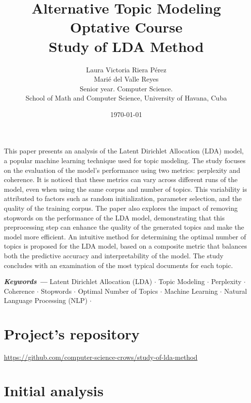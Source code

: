 \documentclass[10pt]{article} %
\title{\normalsize{Alternative Topic Modeling Optative Course}\\
	\Huge\bfseries Study of LDA Method \\
} %
\author{%
	Laura Victoria Riera P\'erez\\
	Mari\'e del Valle Reyes \vspace{1em} \\
	\small Senior year. Computer Science. \\ %
	\small School of Math and Computer Science, University of Havana, Cuba \\ %
}
\date{\footnotesize \today } %
\providecommand{\keywords}[1]
{
	\small	
	\vspace{0.5em}
	\noindent \textbf{\textit{Keywords --- }} #1
}
\renewenvironment{abstract}
{\small
	\begin{center}
		\bfseries \abstractname\vspace{-.5em}\vspace{0pt}
	\end{center}
	\list{}{
		\setlength{\leftmargin}{1.5cm}%
		\setlength{\rightmargin}{\leftmargin}%
	}%
	\item\relax}
{\endlist}
\begin{document}
	
	\maketitle
	
	\begin{abstract}
		This paper presents an analysis of the Latent Dirichlet Allocation (LDA) model, a popular machine learning technique used for topic modeling. The study focuses on the evaluation of the model's performance using two metrics: perplexity and coherence. It is noticed that these metrics can vary across different runs of the model, even when using the same corpus and number of topics. This variability is attributed to factors such as random initialization, parameter selection, and the quality of the training corpus. The paper also explores the impact of removing stopwords on the performance of the LDA model, demonstrating that this preprocessing step can enhance the quality of the generated topics and make the model more efficient. An intuitive method for determining the optimal number of topics is proposed for the LDA model, based on a composite metric that balances both the predictive accuracy and interpretability of the model. The study concludes with an examination of the most typical documents for each topic.
		
		\keywords{Latent Dirichlet Allocation (LDA) $\cdot$
			Topic Modeling $\cdot$
			Perplexity $\cdot$
			Coherence $\cdot$
			Stopwords $\cdot$
			Optimal Number of Topics $\cdot$
			Machine Learning $\cdot$
			Natural Language Processing (NLP) $\cdot$ }
	\end{abstract}

	\section*{Project's repository}
	
	\begin{center}
		\href{https://github.com/computer-science-crows/study-of-lda-method}{https://github.com/computer-science-crows/study-of-lda-method}
	\end{center}
	
	\section{Initial analysis}
	
\end{document}
